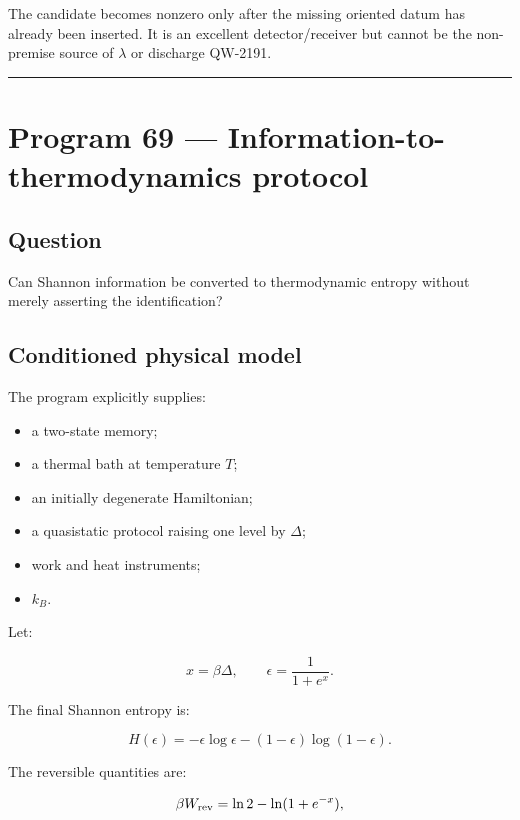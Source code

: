 \documentclass[11pt,a4paper,openany]{report}
\begin{document}
The candidate becomes nonzero only after the missing oriented datum has already been inserted. It is an excellent detector/\allowbreak{}receiver but cannot be the non-premise source of \(\lambda\) or discharge QW-2191.

\par\medskip\hrule\medskip

\chapter{Program 69 — Information-to-thermodynamics protocol}

\section{Question}

Can Shannon information be converted to thermodynamic entropy without merely asserting the identification?

\section{Conditioned physical model}

The program explicitly supplies:

\begin{itemize}
\item 
a two-state memory;

\item 
a thermal bath at temperature \(T\);

\item 
an initially degenerate Hamiltonian;

\item 
a quasistatic protocol raising one level by \(\Delta\);

\item 
work and heat instruments;

\item 
\(k_B\).

\end{itemize}

Let:

\[
x=\beta\Delta,
\qquad
\epsilon=\frac{1}{1+e^x}.
\]

The final Shannon entropy is:

\[
H(\epsilon)
=
-\epsilon\log\epsilon
-(1-\epsilon)\log(1-\epsilon).
\]

The reversible quantities are:

\[
\beta W_{\rm rev}
=
\ln2-\ln(1+e^{-x}),
\]
\end{document}
